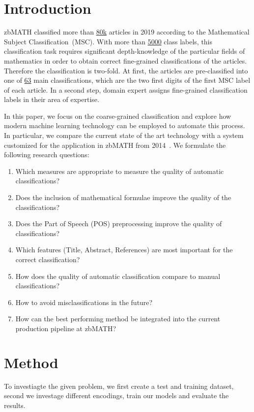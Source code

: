 \section{Introduction}\label{sec:intro}
zbMATH classified more than 
\href{https://zbmath.org/?q=%2A+py%3A2019}%
{80k} articles in 2019 according to the Mathematical Subject Classification~(MSC).
With more than
\href{https://msc2020.org}%
{5000} class labels, this classification task requires significant depth-knowledge of the particular fields of mathematics in order to obtain correct fine-grained classifications of the articles.
Therefore the classification is two-fold.
At first, the articles are pre-classified into one of \href{https://msc2020.org}%
{63} main classifications, which are the two first digits of the first MSC label of each article.
In a second step, domain expert assigns fine-grained classification labels in their area of expertise.

In this paper, we focus on the coarse-grained classification and explore how modern machine learning technology can be employed to automate this process.
In particular, we compare the current state of the art technology with a system customized for the application in zbMATH from 2014~\cite{SchonebergS14}. 
We formulate the following research questions:
\begin{enumerate}
  \item Which measures are appropriate to measure the quality of automatic classifications?
  \item Does the inclusion of mathematical formulae improve the quality of the classifications?
  \item Does the Part of Speech (POS) preprocessing improve the quality of classifications?
  \item Which features (Title, Abstract, References) are most important for the correct classification?
  \item How does the quality of automatic classification compare to manual classifications?
  \item How to avoid misclassifications in the future?
  \item How can the best performing method be integrated into the current production pipeline at zbMATH?
\end{enumerate}
\section{Method}\label{sec:method}
To investiagte the given problem, we first create a test and training dataset, second we investage different encodings, train our models and evaluate the results.

